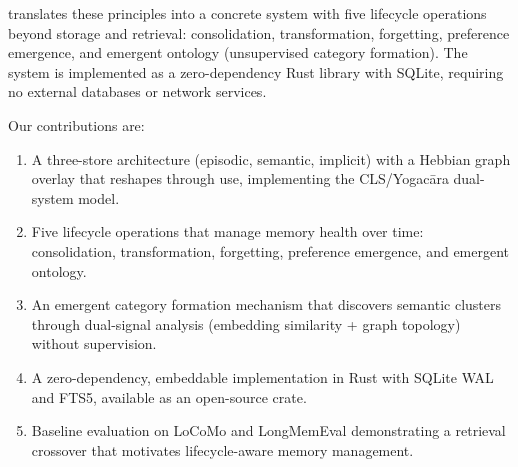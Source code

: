 \noindent \alaya{} translates these principles into a concrete system with
five lifecycle operations beyond storage and retrieval: consolidation,
transformation, forgetting, preference emergence, and emergent ontology
(unsupervised category formation). The system is implemented as a
zero-dependency Rust library with SQLite, requiring no external databases or
network services.

Our contributions are:
\begin{enumerate}[leftmargin=*, nosep]
    \item A three-store architecture (episodic, semantic, implicit) with a
    Hebbian graph overlay that reshapes through use, implementing the
    CLS/Yogac\=ara dual-system model.
    \item Five lifecycle operations that manage memory health over time:
    consolidation, transformation, forgetting, preference emergence, and
    emergent ontology.
    \item An emergent category formation mechanism that discovers semantic
    clusters through dual-signal analysis (embedding similarity + graph
    topology) without supervision.
    \item A zero-dependency, embeddable implementation in Rust with SQLite
    WAL and FTS5, available as an open-source crate.
    \item Baseline evaluation on LoCoMo and LongMemEval demonstrating a
    retrieval crossover that motivates lifecycle-aware memory management.
\end{enumerate}
